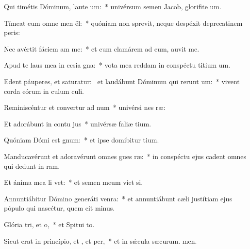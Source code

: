 \item Qui timétis Dóminum, laute um:~* univérsum semen Jacob, glorifite um.
\item Tímeat eum omne men ël:~* quóniam non sprevit, neque despéxit deprecatinem peris:
\item Nec avértit fáciem am  me:~* et cum clamárem ad eum, auvit me.
\item Apud te laus mea in ecsia gna:~* vota mea reddam in conspéctu titium um.
\item Edent páuperes, et saturatur:~\pscross{} et laudábunt Dóminum qui rerunt um:~* vivent corda eórum in culum culi.
\item Reminiscéntur et convertur ad num~* univérsi nes ræ:
\item Et adorábunt in contu jus~* univérsæ faliæ tium.
\item Quóniam Dómi est gnum:~* et ipse domibitur tium.
\item Manducavérunt et adoravérunt omnes gues ræ:~* in conspéctu ejus cadent omnes qui dedunt in ram.
\item Et ánima mea li vet:~* et semen meum viet si.
\item Annuntiábitur Dómino generáti venra:~* et annuntiábunt cæli justítiam ejus pópulo qui nascétur, quem cit minus.
\item Glória tri, et o,~* et Spitui to.
\item Sicut erat in princípio, et , et per,~* et in sǽcula sæcurum. men.
